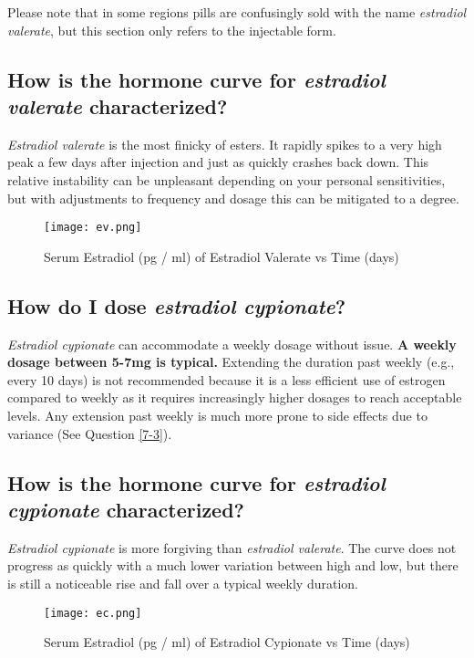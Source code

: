 \documentclass{article}
\begin{document}
Please note that in some regions pills are confusingly sold with the name \textit{estradiol valerate}, but this section only refers to the injectable form.

\subsection{How is the hormone curve for \textit{estradiol valerate} characterized?}

\textit{Estradiol valerate} is the most finicky of esters. It rapidly spikes to a very high peak a few days after injection and just as quickly crashes back down. This relative instability can be unpleasant depending on your personal sensitivities, but with adjustments to frequency and dosage this can be mitigated to a degree.

 \begin{figure}[H]
     \centering
     \texttt{[image: ev.png]}
     \caption{Serum Estradiol (pg / ml) of Estradiol Valerate vs Time (days) }
     \label{fig:ev}
 \end{figure}

\subsection{How do I dose \textit{estradiol cypionate}?}

\textit{Estradiol cypionate} can accommodate a weekly dosage without issue. \textbf{A weekly dosage between 5-7mg is typical.} Extending the duration past weekly (e.g., every 10 days) is not recommended because it is a less efficient use of estrogen compared to weekly as it requires increasingly higher dosages to reach acceptable levels. Any extension past weekly is much more prone to side effects due to variance (See Question \ref{7-3}).

\subsection{How is the hormone curve for \textit{estradiol cypionate} characterized?}

\textit{Estradiol cypionate} is more forgiving than \textit{estradiol valerate}. The curve does not progress as quickly with a much lower variation between high and low, but there is still a noticeable rise and fall over a typical weekly duration.

 \begin{figure}[H]
     \centering
     \texttt{[image: ec.png]}
     \caption{Serum Estradiol (pg / ml) of Estradiol Cypionate vs Time (days) }
     \label{fig:ec}
 \end{figure}
\end{document}
